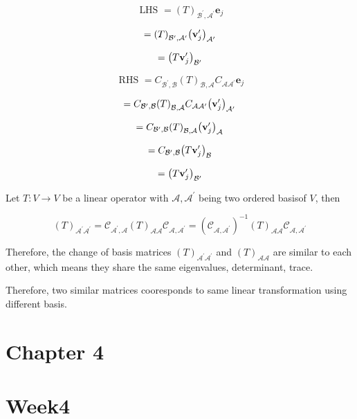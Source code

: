 \documentclass[11pt]{article}
\begin{document}
\[
\text{ LHS } = {\left( T\right) }_{{\mathcal{B}}^{\prime },{\mathcal{A}}^{\prime }}{\mathbf{e}}_{j}
\]

\[
= {\left( T\right) }_{{\mathcal{B}}^{\prime },{\mathcal{A}}^{\prime }}{\left( {\bf v}_{j}^{\prime }\right) }_{{\mathcal{A}}^{\prime }}
\]

\[
= {\left( T{\bf v}_{j}^{\prime }\right) }_{{\mathcal{B}}^{\prime }}
\]

\[
\text{ RHS } = {C}_{{\mathcal{B}}^{\prime },\mathcal{B}}{\left( T\right) }_{\mathcal{B},\mathcal{A}}{C}_{\mathcal{A}{\mathcal{A}}^{\prime }}{\mathbf{e}}_{j}
\]

\[
= {C}_{{\mathcal{B}}^{\prime },\mathcal{B}}{\left( T\right) }_{\mathcal{B},\mathcal{A}}{C}_{\mathcal{A}{\mathcal{A}}^{\prime }}{\left( {\bf v}_{j}^{\prime }\right) }_{{\mathcal{A}}^{\prime }}
\]

\[
= {C}_{{\mathcal{B}}^{\prime },\mathcal{B}}{\left( T\right) }_{\mathcal{B},\mathcal{A}}{\left( {\bf v}_{j}^{\prime }\right) }_{\mathcal{A}}
\]

\[
= {C}_{{\mathcal{B}}^{\prime },\mathcal{B}}{\left( T{\bf v}_{j}^{\prime }\right) }_{\mathcal{B}}
\]

\[
= {\left( T{\bf v}_{j}^{\prime }\right) }_{{\mathcal{B}}^{\prime }}
\]

Let \(T : V \rightarrow  V\) be a linear operator with \(\mathcal{A},{\mathcal{A}}^{\prime }\) being two ordered basisof \(V\), then

\[
{\left( T\right) }_{{\mathcal{A}}^{\prime }{\mathcal{A}}^{\prime }} = {\mathcal{C}}_{{\mathcal{A}}^{\prime },\mathcal{A}}{\left( T\right) }_{\mathcal{A}\mathcal{A}}{\mathcal{C}}_{\mathcal{A},{\mathcal{A}}^{\prime }} = {\left( {\mathcal{C}}_{\mathcal{A},{\mathcal{A}}^{\prime }}\right) }^{-1}{\left( T\right) }_{\mathcal{A}\mathcal{A}}{\mathcal{C}}_{\mathcal{A},{\mathcal{A}}^{\prime }}
\]

Therefore, the change of basis matrices \({\left( T\right) }_{{\mathcal{A}}^{\prime }{\mathcal{A}}^{\prime }}\) and \({\left( T\right) }_{\mathcal{A}\mathcal{A}}\) are similar to each other, which means they share the same eigenvalues, determinant, trace.

Therefore, two similar matrices cooresponds to same linear transformation using different basis.

\section*{Chapter 4}

\section*{Week4}
\end{document}
